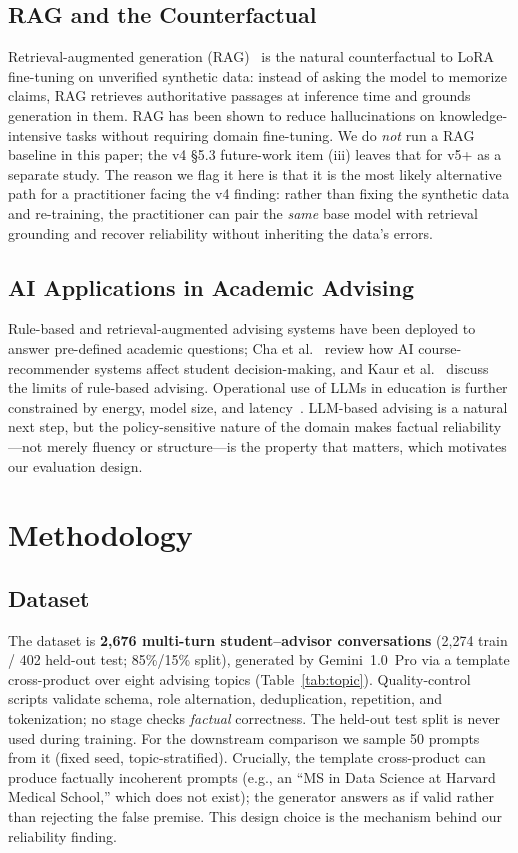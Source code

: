 \documentclass[11pt]{article}
\begin{document}
\subsection{RAG and the Counterfactual}
Retrieval-augmented generation (RAG)~\cite{lewis2020,gao2024} is the natural counterfactual to LoRA fine-tuning on unverified synthetic data: instead of asking the model to memorize claims, RAG retrieves authoritative passages at inference time and grounds generation in them. RAG has been shown to reduce hallucinations on knowledge-intensive tasks without requiring domain fine-tuning. We do \emph{not} run a RAG baseline in this paper; the v4 \S5.3 future-work item (iii) leaves that for v5+ as a separate study. The reason we flag it here is that it is the most likely alternative path for a practitioner facing the v4 finding: rather than fixing the synthetic data and re-training, the practitioner can pair the \emph{same} base model with retrieval grounding and recover reliability without inheriting the data's errors.

\subsection{AI Applications in Academic Advising}
Rule-based and retrieval-augmented advising systems have been deployed to answer pre-defined academic questions; Cha et al.~\cite{cha2024} review how AI course-recommender systems affect student decision-making, and Kaur et al.~\cite{kaur2022} discuss the limits of rule-based advising. Operational use of LLMs in education is further constrained by energy, model size, and latency~\cite{zhao2023}. LLM-based advising is a natural next step, but the policy-sensitive nature of the domain makes factual reliability---not merely fluency or structure---is the property that matters, which motivates our evaluation design.

\section{Methodology}
\subsection{Dataset}
The dataset is \textbf{2{,}676 multi-turn student--advisor conversations} (2{,}274 train / 402 held-out test; 85\%/15\% split), generated by Gemini~1.0~Pro via a template cross-product over eight advising topics (Table~\ref{tab:topic}). Quality-control scripts validate schema, role alternation, deduplication, repetition, and tokenization; no stage checks \emph{factual} correctness. The held-out test split is never used during training. For the downstream comparison we sample 50 prompts from it (fixed seed, topic-stratified). Crucially, the template cross-product can produce factually incoherent prompts (e.g., an ``MS in Data Science at Harvard Medical School,'' which does not exist); the generator answers as if valid rather than rejecting the false premise. This design choice is the mechanism behind our reliability finding.
\end{document}
